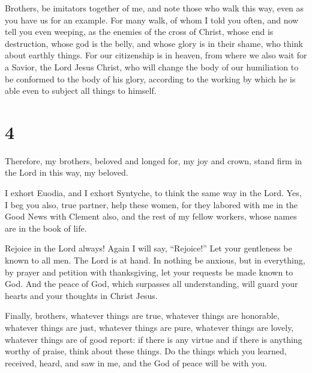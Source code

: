  Brothers, be imitators together of me, and note those
who walk this way, even as you have us for an example. 
For many walk, of whom I told you often, and now tell you even weeping,
as the enemies of the cross of Christ,  whose end is
destruction, whose god is the belly, and whose glory is in their shame,
who think about earthly things.  For our citizenship is
in heaven, from where we also wait for a Savior, the Lord Jesus Christ,
 who will change the body of our humiliation to be
conformed to the body of his glory, according to the working by which he
is able even to subject all things to himself.

\hypertarget{section-3}{%
\section{4}\label{section-3}}

 Therefore, my brothers, beloved and longed for, my joy
and crown, stand firm in the Lord in this way, my beloved.

 I exhort Euodia, and I exhort Syntyche, to think the same
way in the Lord.  Yes, I beg you also, true partner, help
these women, for they labored with me in the Good News with Clement
also, and the rest of my fellow workers, whose names are in the book of
life.

 Rejoice in the Lord always! Again I will say,
``Rejoice!''  Let your gentleness be known to all men. The
Lord is at hand.  In nothing be anxious, but in
everything, by prayer and petition with thanksgiving, let your requests
be made known to God.  And the peace of God, which
surpasses all understanding, will guard your hearts and your thoughts in
Christ Jesus.

 Finally, brothers, whatever things are true, whatever
things are honorable, whatever things are just, whatever things are
pure, whatever things are lovely, whatever things are of good report: if
there is any virtue and if there is anything worthy of praise, think
about these things.  Do the things which you learned,
received, heard, and saw in me, and the God of peace will be with you.

